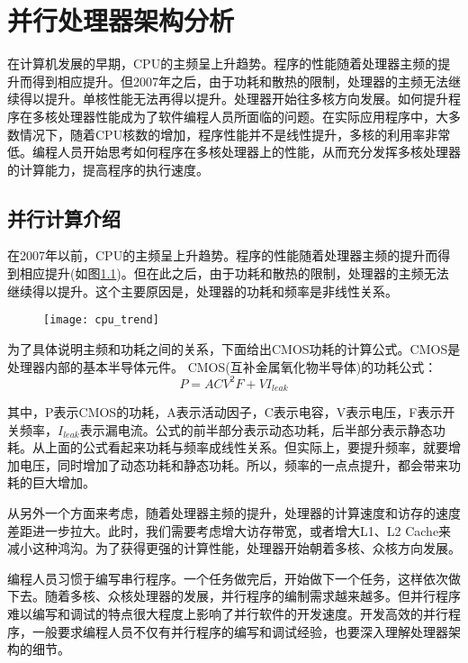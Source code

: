 \chapter{并行处理器架构分析}\label{chap:parallelArch}
在计算机发展的早期，CPU的主频呈上升趋势。程序的性能随着处理器主频的提升而得到相应提升。但2007年之后，由于功耗和散热的限制，处理器的主频无法继续得以提升。单核性能无法再得以提升。处理器开始往多核方向发展。如何提升程序在多核处理器性能成为了软件编程人员所面临的问题。在实际应用程序中，大多数情况下，随着CPU核数的增加，程序性能并不是线性提升，多核的利用率非常低。编程人员开始思考如何程序在多核处理器上的性能，从而充分发挥多核处理器的计算能力，提高程序的执行速度。

\section{并行计算介绍}
在2007年以前，CPU的主频呈上升趋势。程序的性能随着处理器主频的提升而得到相应提升(如图\ref{fig:cpu_trend})。但在此之后，由于功耗和散热的限制，处理器的主频无法继续得以提升。这个主要原因是，处理器的功耗和频率是非线性关系。
\begin{figure}[htbp]
	\centering
	\texttt{[image: cpu\_trend]}
	\label{fig:cpu_trend}
\end{figure}
为了具体说明主频和功耗之间的关系，下面给出CMOS功耗的计算公式。CMOS是处理器内部的基本半导体元件。
CMOS(互补金属氧化物半导体)的功耗公式：
\begin{equation}
	\label{eq:power}
	P=ACV^{2}F+VI_{leak}
\end{equation}

其中，P表示CMOS的功耗，A表示活动因子，C表示电容，V表示电压，F表示开关频率，$I_{leak}$表示漏电流。公式的前半部分表示动态功耗，后半部分表示静态功耗。从上面的公式看起来功耗与频率成线性关系。但实际上，要提升频率，就要增加电压，同时增加了动态功耗和静态功耗。所以，频率的一点点提升，都会带来功耗的巨大增加。

从另外一个方面来考虑，随着处理器主频的提升，处理器的计算速度和访存的速度差距进一步拉大。此时，我们需要考虑增大访存带宽，或者增大L1、L2 Cache来减小这种鸿沟。为了获得更强的计算性能，处理器开始朝着多核、众核方向发展。

编程人员习惯于编写串行程序。一个任务做完后，开始做下一个任务，这样依次做下去。随着多核、众核处理器的发展，并行程序的编制需求越来越多。但并行程序难以编写和调试的特点很大程度上影响了并行软件的开发速度。开发高效的并行程序，一般要求编程人员不仅有并行程序的编写和调试经验，也要深入理解处理器架构的细节。

